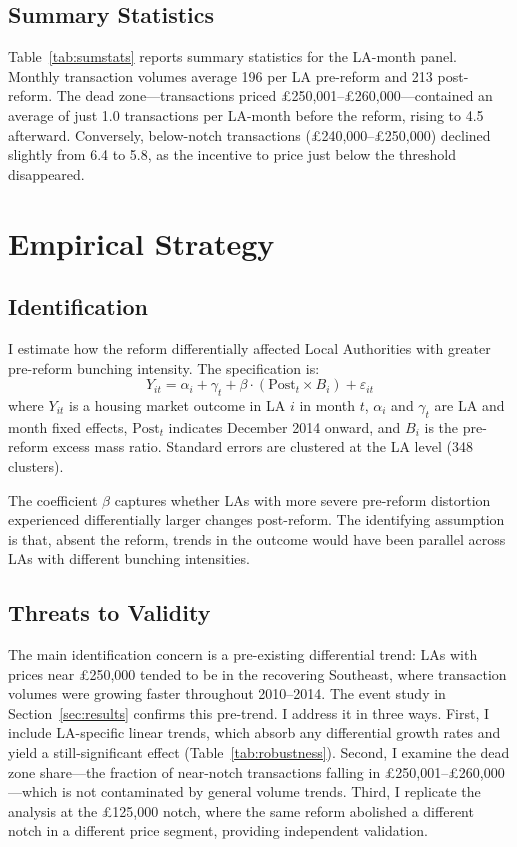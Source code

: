 \documentclass[12pt]{article}
\begin{document}
\subsection{Summary Statistics}



Table~\ref{tab:sumstats} reports summary statistics for the LA-month panel. Monthly transaction volumes average 196 per LA pre-reform and 213 post-reform. The dead zone---transactions priced \pounds250,001--\pounds260,000---contained an average of just 1.0 transactions per LA-month before the reform, rising to 4.5 afterward. Conversely, below-notch transactions (\pounds240,000--\pounds250,000) declined slightly from 6.4 to 5.8, as the incentive to price just below the threshold disappeared.

\section{Empirical Strategy}

\subsection{Identification}

I estimate how the reform differentially affected Local Authorities with greater pre-reform bunching intensity. The specification is:
\begin{equation}
Y_{it} = \alpha_i + \gamma_t + \beta \cdot (\text{Post}_t \times B_i) + \varepsilon_{it}
\label{eq:main}
\end{equation}
where $Y_{it}$ is a housing market outcome in LA $i$ in month $t$, $\alpha_i$ and $\gamma_t$ are LA and month fixed effects, $\text{Post}_t$ indicates December 2014 onward, and $B_i$ is the pre-reform excess mass ratio. Standard errors are clustered at the LA level (348 clusters).

The coefficient $\beta$ captures whether LAs with more severe pre-reform distortion experienced differentially larger changes post-reform. The identifying assumption is that, absent the reform, trends in the outcome would have been parallel across LAs with different bunching intensities.

\subsection{Threats to Validity}

The main identification concern is a pre-existing differential trend: LAs with prices near \pounds250,000 tended to be in the recovering Southeast, where transaction volumes were growing faster throughout 2010--2014. The event study in Section~\ref{sec:results} confirms this pre-trend. I address it in three ways. First, I include LA-specific linear trends, which absorb any differential growth rates and yield a still-significant effect (Table~\ref{tab:robustness}). Second, I examine the dead zone share---the fraction of near-notch transactions falling in \pounds250,001--\pounds260,000---which is not contaminated by general volume trends. Third, I replicate the analysis at the \pounds125,000 notch, where the same reform abolished a different notch in a different price segment, providing independent validation.
\end{document}
